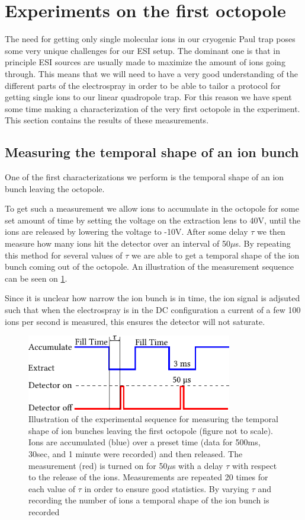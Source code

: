 \section{Experiments on the first octopole}
\label{sec:octopoleExperiments}
The need for getting only single molecular ions in our cryogenic Paul trap poses some very unique challenges for our ESI setup. The dominant one is that in principle ESI sources are usually made to maximize the amount of ions going through. This means that we will need to have a very good understanding of the different parts of the electrospray in order to be able to tailor a protocol for getting single ions to our linear quadropole trap.
For this reason we have spent some time making a characterization of the very first octopole in the experiment. 
This section contains the results of these measurements.

\subsection{Measuring the temporal shape of an ion bunch}
One of the first characterizations we perform is the temporal shape of an ion bunch leaving the octopole.

To get such a measurement we allow ions to accumulate in the octopole for some set amount of time by setting the voltage on the extraction lens to 40V, until the ions are released by lowering the voltage to -10V. After some delay $\tau$ we then measure how many ions hit the detector over an interval of 50$\mu$s. By repeating this method for several values of $\tau$ we are able to get a temporal shape of the ion bunch coming out of the octopole.
An illustration of the measurement sequence can be seen on \cref{fig:sequenceShape}. 

Since it is unclear how narrow the ion bunch is in time, the ion signal is adjsuted such that when the electrospray is in the DC configuration a current of a few 100 ions per second is measured, this ensures the detector will not saturate.
\begin{figure}
    \centering
    \includegraphics[width = 0.8\textwidth]{main/ShapePulse.pdf}
    \caption{Illustration of the experimental sequence for measuring the temporal shape of ion bunches leaving the first octopole (figure not to scale). Ions are accumulated (blue) over a preset time (data for 500ms, 30sec, and 1 minute were recorded) and then released. The measurement (red) is turned on for 50$\mu$s with a delay $\tau$ with respect to the release of the ions.
    Measurements are repeated 20 times for each value of $\tau$ in order to ensure good statistics. By varying $\tau$ and recording the number of ions a temporal shape of the ion bunch is recorded}
    \label{fig:sequenceShape}
\end{figure}


